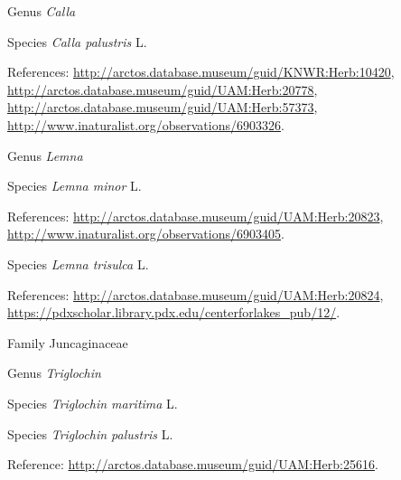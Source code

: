 \documentclass[9pt, article]{memoir}
\begin{document}
\begin{multicols}{2}
\vspace{6pt}\noindent\hspace{30pt}Genus \textit{Calla}


\vspace{6pt}\noindent\hspace{36pt}Species \textit{Calla palustris} L.


\vspace{6pt}References: 
\url{http://arctos.database.museum/guid/KNWR:Herb:10420}, 
\url{http://arctos.database.museum/guid/UAM:Herb:20778}, 
\url{http://arctos.database.museum/guid/UAM:Herb:57373}, 
\url{http://www.inaturalist.org/observations/6903326}.

\vspace{6pt}\noindent\hspace{30pt}Genus \textit{Lemna}


\vspace{6pt}\noindent\hspace{36pt}Species \textit{Lemna minor} L.


\vspace{6pt}References: 
\url{http://arctos.database.museum/guid/UAM:Herb:20823}, 
\url{http://www.inaturalist.org/observations/6903405}.

\vspace{6pt}\noindent\hspace{36pt}Species \textit{Lemna trisulca} L.


\vspace{6pt}References: 
\url{http://arctos.database.museum/guid/UAM:Herb:20824}, 
\url{https://pdxscholar.library.pdx.edu/centerforlakes_pub/12/}.

\vspace{6pt}\noindent\hspace{24pt}Family Juncaginaceae


\vspace{6pt}\noindent\hspace{30pt}Genus \textit{Triglochin}


\vspace{6pt}\noindent\hspace{36pt}Species \textit{Triglochin maritima} L.


\vspace{6pt}\noindent\hspace{36pt}Species \textit{Triglochin palustris} L.


\vspace{6pt}Reference: 
\url{http://arctos.database.museum/guid/UAM:Herb:25616}.


\end{multicols}
\end{document}
